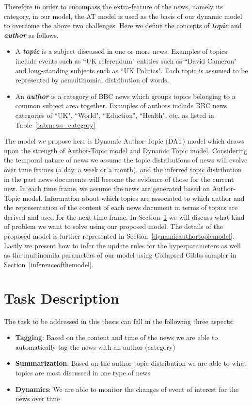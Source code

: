 Therefore in order to encompass the extra-feature of the news, namely its category, in our model, the AT model is used as the basis of our dynamic model to overcome the above two challenges. Here we define the concepts of \textbf{\textit{topic}} and \textbf{\textit{author}} as follows,
\begin{itemize}
  \item A \textbf{\textit{topic}} is a subject discussed in one or more news. Examples of topics include events such as ``UK referendum" entities such as ``David Cameron" and long-standing subjects such as ``UK Politics". Each topic is assumed to be represented by acmultinomial distribution of words.
  \item An \textbf{\textit{author}} is a category of BBC news which groups topics belonging to a common subject
  area together. Examples of authors include BBC news categories of ``UK", ``World", ``Eduction", ``Health", etc, as listed in Table~\ref{tab:news_category}
  \end{itemize}
The model we propose here is Dynamic Author-Topic (DAT) model which draws upon the strength of Author-Topic model and Dynamic Topic model. Considering the temporal nature of news we assume the topic distributions of news will evolve over time frames (a day, a week or a month), and the inferred topic distribution in the past news documents will become the evidence of those for the current new. In each time frame, we assume the news are generated based on Author-Topic model. Information about which topics are associated to which author and the representation of the content of each news document in terms of topics are derived and used for the next time frame. In Section~\ref{taskdescription} we will discuss what kind of problem we want to solve using our proposed model. The details of the proposed model is further represented in Section~\ref{dynamicauthortopicmodel}. Lastly we present how to infer the update rules for the hyperparameters as well as the multinomila parameters of our model using Collapsed Gibbs sampler in Section~\ref{inferenceofthemodel}.

\section{Task Description}
\label{taskdescription}
The task to be addressed in this thesis can fall in the following three aspects:

\begin{itemize}
  \item \textbf{Tagging}: Based on the content and time of the news we are able to automatically tag the news with an author (category)
  \item \textbf{Summarization}: Based on the author-topic distribution we are able to what topics are most discussed in one type of news
  \item \textbf{Dynamics}: We are able to monitor the changes of event of interest for the news over time
\end{itemize}

